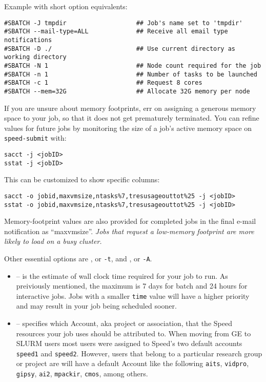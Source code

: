 Example with short option equivalents:

\begin{verbatim}
#SBATCH -J tmpdir                   ## Job's name set to 'tmpdir'
#SBATCH --mail-type=ALL             ## Receive all email type notifications
#SBATCH -D ./                       ## Use current directory as working directory
#SBATCH -N 1                        ## Node count required for the job
#SBATCH -n 1                        ## Number of tasks to be launched
#SBATCH -c 1                        ## Request 8 cores
#SBATCH --mem=32G                   ## Allocate 32G memory per node 
\end{verbatim}

%
If you are unsure about memory footprints, err on assigning a generous
memory space to your job, so that it does not get prematurely terminated.
You can refine
values for future jobs by monitoring the size of a job's active
memory space on \texttt{speed-submit} with:


\begin{verbatim}
sacct -j <jobID>
sstat -j <jobID>
\end{verbatim}

\noindent
This can be customized to show specific columns:

\begin{verbatim}
sacct -o jobid,maxvmsize,ntasks%7,tresusageouttot%25 -j <jobID>
sstat -o jobid,maxvmsize,ntasks%7,tresusageouttot%25 -j <jobID>
\end{verbatim}

Memory-footprint values are also provided for completed jobs in the final
e-mail notification as ``maxvmsize''.
%
\emph{Jobs that request a low-memory footprint are more likely to load on a busy
cluster.}

Other essential options are , or \verb|-t|, and , or \verb|-A|.
%
\begin{itemize}
\item
{} -- is the estimate of wall clock time required for your job to run. 
As preiviously mentioned, the maximum is 7 days for batch and 24 hours for interactive jobs. 
Jobs with a smaller \texttt{time} value will have a higher priority and may result in your job being scheduled sooner. 

\item
{} -- specifies which Account, aka project or association, 
that the Speed resources your job uses should be attributed to. When moving from 
GE to SLURM users most users were assigned to Speed's two default accounts 
\texttt{speed1} and \texttt{speed2}. However, users that belong to a particular research
group or project are will have a default Account like the following
\texttt{aits},
\texttt{vidpro},
\texttt{gipsy},
\texttt{ai2},
\texttt{mpackir},
\texttt{cmos}, among others.

\end{itemize}